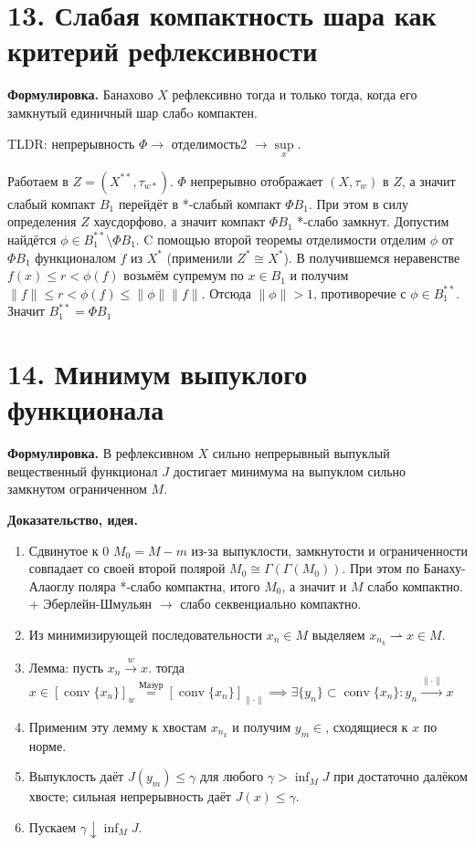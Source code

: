 \documentclass[10pt,a4paper]{article}
\newcommand{\X}{X}
\begin{document}
	\section*{13. Слабая компактность шара как критерий рефлексивности}
	\textbf{Формулировка.} Банахово $\X$ рефлексивно тогда и только тогда, когда его замкнутый единичный шар слабo компактен.

	TLDR: непрерывность $\Phi \to$ отделимость2 $\to \sup\limits_x$.

	Работаем в $Z = (\X^{**}, \tau_{w*})$. $\Phi$ непрерывно отображает $(X, \tau_w)$ в $Z$, а значит слабый компакт $B_1$ перейдёт в *-слабый компакт $\Phi B_1$. При этом в силу определения $Z$ хаусдорфово, а значит компакт $\Phi B_1$ *-слабо замкнут. Допустим найдётся
	$\phi \in B^{**}_1 \setminus \Phi B_1$. C помощью второй теоремы отделимости отделим $\phi$ от $\Phi B_1$ функционалом $f$ из $X^*$ (применили $Z^* \cong X^*$). В получившемся неравенстве $f(x) \leq r < \phi(f)$ возьмём супремум по $x\in B_1$ и получим
	$\|f\| \leq r < \phi(f) \leq \|\phi\|\|f\|$.
	Отсюда $\|\phi\|>1$, противоречие с $\phi \in B_1^{**}$. Значит $B^{**}_1 = \Phi B_1$

	\section*{14. Минимум выпуклого функционала}
	\textbf{Формулировка.} В рефлексивном $X$ сильно непрерывный выпуклый вещественный функционал $J$ достигает минимума на выпуклом сильно замкнутом ограниченном $M$.

	\textbf{Доказательство, идея.}
	\begin{enumerate}
		\item Сдвинутое к $0$ $M_0 = M -m$ из-за выпуклости, замкнутости и ограниченности совпадает со своей второй полярой $M_0 \cong \Gamma(\Gamma(M_0))$. При этом по Банаху-Алаоглу поляра *-слабо компактна, итого $M_0$, а значит и $M$ слабо компактно. + Эберлейн-Шмульян $\to$ слабо секвенциально компактно.
		\item Из минимизирующей последовательности $x_n\in M$ выделяем $x_{n_k}\rightharpoonup x\in M$.
		\item Лемма: пусть $x_n \stackrel{w}{\to} x$.
		тогда $x \in [\operatorname{conv} \{x_n\}]_w \stackrel{\text{Мазур}}{=} [\operatorname{conv} \{x_n\}]_{\|\cdot\|} \implies \exists \{y_n\} \subset \operatorname{conv} \{x_n\}: y_n \stackrel{\|\cdot\|}{\to} x$

		\item Применим эту лемму к хвостам $x_{n_k}$ и получим $y_m \in $, сходящиеся к $x$ по норме.
		\item Выпуклость даёт $J(y_m)\le\gamma$ для любого $\gamma>\inf_MJ$ при достаточно далёком хвосте; сильная непрерывность даёт $J(x)\le\gamma$.
		\item Пускаем $\gamma\downarrow\inf_MJ$.
	\end{enumerate}
\end{document}
